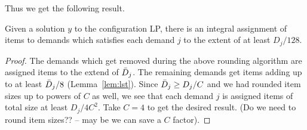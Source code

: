 Thus we get the following result. 
\begin{theorem}
\label{thm:config}
Given a solution $y$ to the configuration LP, there is an integral assignment of items to demands which satisfies each demand $j$ to the extent of at least 
$D_j/128$. 
\end{theorem}
\begin{proof}
The demands which get removed during the above rounding algorithm are assigned items to the extend of ${\bar D}_j$. The remaining demands
get items adding up to at least ${\bar D}_j/8$ (Lemma~\ref{lem:lst}). Since ${\bar D}_j \geq D_j/C$ and we had rounded item sizes up to powers of $C$ as
well, we see that each demand $j$ is assigned items of total size at least $D_j/4C^2$. Take $C=4$ to get the desired result. 
(Do we need to round item sizes?? -- may be we can save a $C$ factor). 
\end{proof}
